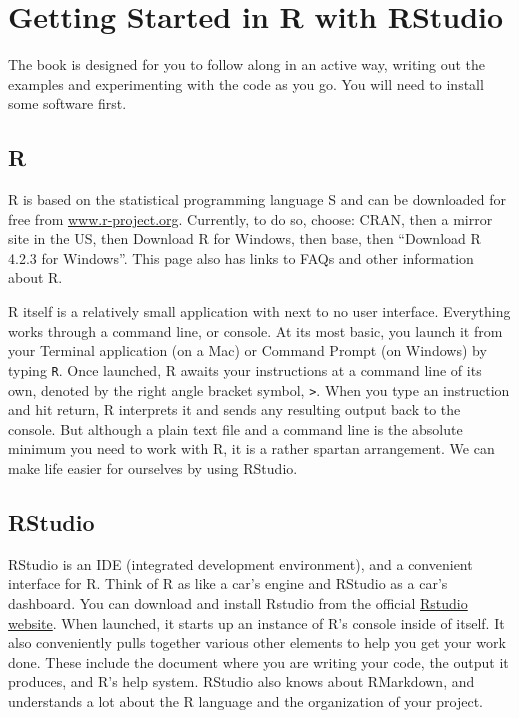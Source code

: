 \documentclass[
]{book}
\begin{document}
\hypertarget{getting-started-in-r-with-rstudio}{%
\section*{Getting Started in R with RStudio}\label{getting-started-in-r-with-rstudio}}

The book is designed for you to follow along in an active way, writing out the examples and experimenting with the code as you go. You will need to install some software first.

\hypertarget{r}{%
\subsection*{R}\label{r}}

R is based on the statistical programming language S and can be downloaded for free from \href{https://www.r-project.org/}{www.r-project.org}. Currently, to do so, choose: CRAN, then a mirror site in the US, then Download R for Windows, then base, then ``Download R 4.2.3 for Windows''. This page also has links to FAQs and other information about R.

R itself is a relatively small application with next to no user interface. Everything works through a command line, or console. At its most basic, you launch it from your Terminal application (on a Mac) or Command Prompt (on Windows) by typing \texttt{R}. Once launched, R awaits your instructions at a command line of its own, denoted by the right angle bracket symbol, \texttt{\textgreater{}}. When you type an instruction and hit return, R interprets it and sends any resulting output back to the console. But although a plain text file and a command line is the absolute minimum you need to work with R, it is a rather spartan arrangement. We can make life easier for ourselves by using RStudio.

\hypertarget{rstudio}{%
\subsection*{RStudio}\label{rstudio}}

RStudio is an IDE (integrated development environment), and a convenient interface for R. Think of R as like a car's engine and RStudio as a car's dashboard. You can download and install Rstudio from the official \href{https://rstudio.com/products/rstudio/download/}{Rstudio website}. When launched, it starts up an instance of R's console inside of itself. It also conveniently pulls together various other elements to help you get your work done. These include the document where you are writing your code, the output it produces, and R's help system. RStudio also knows about RMarkdown, and understands a lot about the R language and the organization of your project.
\end{document}
